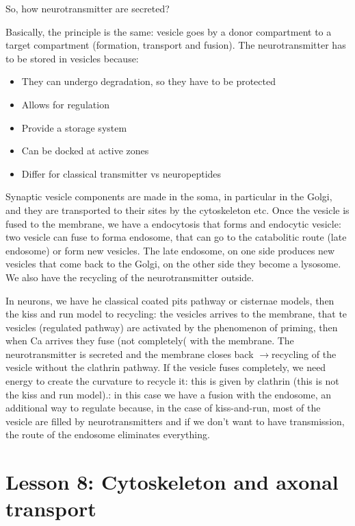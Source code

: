 \documentclass[a4paper, 12pt]{book}
\newcommand{\lfreccia}{\ensuremath{\longrightarrow}}
\begin{document}
So, how neurotransmitter are secreted?

Basically, the principle is the same: vesicle goes by a donor compartment to a target compartment (formation, transport and fusion). The neurotransmitter has to be stored in vesicles because:
\begin{itemize}
\item{They can undergo degradation, so they have to be protected}
\item{Allows for regulation}
\item{Provide a storage system}
\item{Can be docked at active zones}
\item{Differ for classical transmitter vs neuropeptides}
\end{itemize}

Synaptic vesicle components are made in the soma, in particular in the Golgi, and they are transported to their sites by the cytoskeleton etc. Once the vesicle is fused to the membrane, we have a endocytosis that forms and endocytic vesicle: two vesicle can fuse to forma endosome, that can go to the catabolitic route (late endosome) or form new vesicles. The late endosome, on one side produces new vesicles that come back to the Golgi, on the other side they become a lysosome. We also have the recycling of the neurotransmitter outside.

In neurons, we have he classical coated pits pathway or cisternae models, then the kiss and run model to recycling: the vesicles arrives to the membrane, that te vesicles (regulated pathway) are activated by the phenomenon of priming, then when Ca arrives they fuse (not completely( with the membrane. The neurotransmitter is secreted and the membrane closes back \lfreccia recycling of the vesicle without the clathrin pathway. If the vesicle fuses completely, we need energy to create the curvature to recycle it: this is given by clathrin (this is not the kiss and run model).: in this case we have a fusion with the endosome, an additional way to regulate because, in the case of kiss-and-run, most of the vesicle are filled by neurotransmitters and if we don't want to have transmission, the route of the endosome eliminates everything.


\chapter{Lesson 8: Cytoskeleton and axonal transport}
\end{document}
